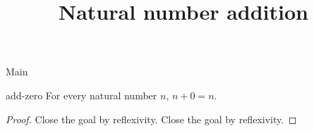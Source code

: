 \begin{lexlean}{Main}
\title{Natural number addition}

\begin{theorem}{add-zero}
\noaxioms
For every natural number \(n\), \(n + 0 = n\).
\begin{proof}
Close the goal by reflexivity.
Close the goal by reflexivity.
\end{proof}
\end{theorem}
\end{lexlean}
